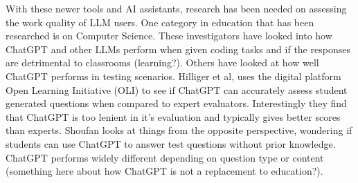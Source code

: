 \documentclass[manuscript,screen,acmsmall]{acmart}
\begin{document}
    With these newer tools and AI assistants, research has been needed on assessing the work quality of LLM users. One category in education that has been researched is on Computer Science. These investigators have looked into how ChatGPT and other LLMs perform when given coding tasks and if the responses are detrimental to classrooms (learning?). Others have looked at how well ChatGPT performs in testing scenarios. Hilliger et al, uses the digital platform Open Learning Initiative (OLI) to see if ChatGPT can accurately assess student generated questions when compared to expert evaluators. Interestingly they find that ChatGPT is too lenient in it's evaluation and typically gives better scores than experts. Shoufan looks at things from the opposite perspective, wondering if students can use ChatGPT to answer test questions without prior knowledge. ChatGPT performs widely different depending on question type or content (something here about how ChatGPT is not a replacement to education?).

    


      
    
\end{document}
